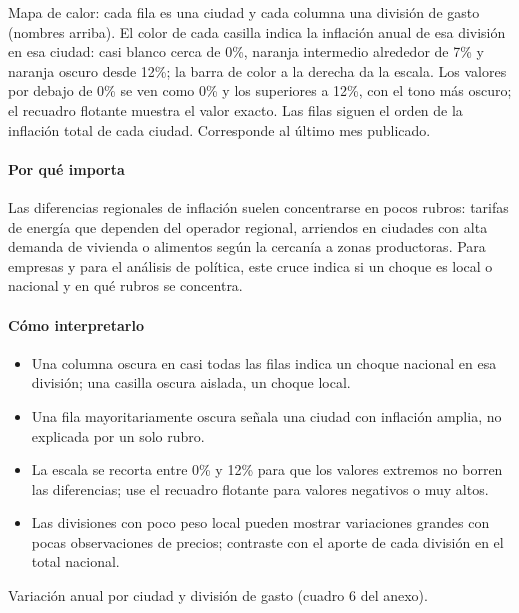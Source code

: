 \begin{leer}
Mapa de calor: cada fila es una ciudad y cada columna una división de gasto (nombres arriba). El color de cada casilla indica la inflación anual de esa división en esa ciudad: casi blanco cerca de 0\%, naranja intermedio alrededor de 7\% y naranja oscuro desde 12\%; la barra de color a la derecha da la escala. Los valores por debajo de 0\% se ven como 0\% y los superiores a 12\%, con el tono más oscuro; el recuadro flotante muestra el valor exacto. Las filas siguen el orden de la inflación total de cada ciudad. Corresponde al último mes publicado.
\end{leer}

\paragraph{Por qué importa}
Las diferencias regionales de inflación suelen concentrarse en pocos rubros: tarifas de energía que dependen del operador regional, arriendos en ciudades con alta demanda de vivienda o alimentos según la cercanía a zonas productoras. Para empresas y para el análisis de política, este cruce indica si un choque es local o nacional y en qué rubros se concentra.

\paragraph{Cómo interpretarlo}
\begin{itemize}
\item Una columna oscura en casi todas las filas indica un choque nacional en esa división; una casilla oscura aislada, un choque local.
\item Una fila mayoritariamente oscura señala una ciudad con inflación amplia, no explicada por un solo rubro.
\item La escala se recorta entre 0\% y 12\% para que los valores extremos no borren las diferencias; use el recuadro flotante para valores negativos o muy altos.
\item Las divisiones con poco peso local pueden mostrar variaciones grandes con pocas observaciones de precios; contraste con el aporte de cada división en el total nacional.
\end{itemize}
\begin{formulas}[Fórmulas]
\end{formulas}
\begin{metodo}[Metodología]
Variación anual por ciudad y división de gasto (cuadro 6 del anexo).
\par{}
\end{metodo}

